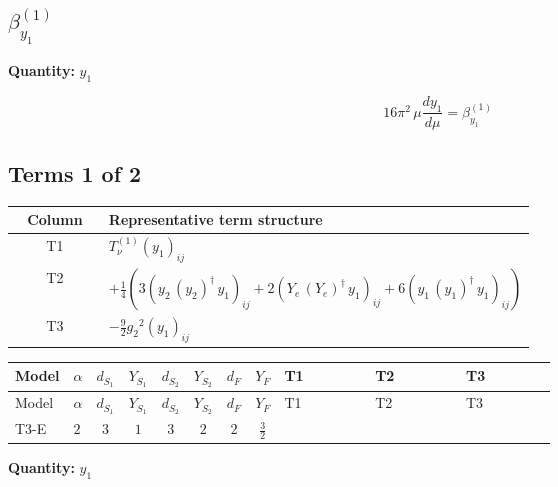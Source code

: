 \documentclass[8pt]{article}
\begin{document}
\begin{landscape}
\section*{$\beta_{y_1}^{(1)}$}
\noindent\textbf{Quantity: }$y_1$\par\smallskip
\[16\pi^2\,\mu\frac{d y_1}{d\mu}=\beta_{y_1}^{(1)}\]
\subsection*{Terms 1 of 2}
\begin{center}
\begin{tabular}{@{}c >{\raggedright\arraybackslash}p{0.82\linewidth}@{}}
\toprule
Column & Representative term structure \\
\midrule
T1 & \(\displaystyle T_{\nu}^{(1)} \left({y_1}\right)_{ij}\) \\
\midrule
T2 & \(\displaystyle +\frac{1}{4} (3 \left({y_2}\,\left({y_2}\right)^{\dagger}\,{y_1}\right)_{ij}+2 \left({Y_e}\,\left({Y_e}\right)^{\dagger}\,{y_1}\right)_{ij}+6 \left({y_1}\,\left({y_1}\right)^{\dagger}\,{y_1}\right)_{ij})\) \\
\midrule
T3 & \(\displaystyle -\frac{9}{2} {g_2}^2 \left({y_1}\right)_{ij}\) \\
\midrule
\bottomrule
\end{tabular}
\end{center}
\smallskip
\tiny
\begin{longtable}{@{}llcccccc >{\raggedright\arraybackslash}p{0.21\linewidth} >{\raggedright\arraybackslash}p{0.21\linewidth} >{\raggedright\arraybackslash}p{0.21\linewidth}@{}}
\toprule
Model & $\alpha$ & $d_{S_1}$ & $Y_{S_1}$ & $d_{S_2}$ & $Y_{S_2}$ & $d_F$ & $Y_F$ & T1 & T2 & T3 \\
\midrule
\endfirsthead
\toprule
Model & $\alpha$ & $d_{S_1}$ & $Y_{S_1}$ & $d_{S_2}$ & $Y_{S_2}$ & $d_F$ & $Y_F$ & T1 & T2 & T3 \\
\midrule
\endhead
T3-E & $2$ & $3$ & $1$ & $3$ & $2$ & $2$ & $\frac{3}{2}$ & \scriptsize\adjustbox{max width=\linewidth}{$\begin{gathered} T_{\nu}^{(1)} \left({y_1}\right)_{ij}\end{gathered}$} & \scriptsize\adjustbox{max width=\linewidth}{$\begin{gathered} +\frac{1}{4} (3 \left({y_2}\,\left({y_2}\right)^{\dagger}\,{y_1}\right)_{ij}+2 \left({Y_e}\,\left({Y_e}\right)^{\dagger}\,{y_1}\right)_{ij}+6 \left({y_1}\,\left({y_1}\right)^{\dagger}\,{y_1}\right)_{ij})\end{gathered}$} & \scriptsize\adjustbox{max width=\linewidth}{$\begin{gathered} -\frac{9}{2} {g_2}^2 \left({y_1}\right)_{ij}\end{gathered}$} \\
\midrule
\bottomrule
\end{longtable}
\clearpage
\noindent\textbf{Quantity: }$y_1$\par\smallskip

\end{landscape}
\end{document}
